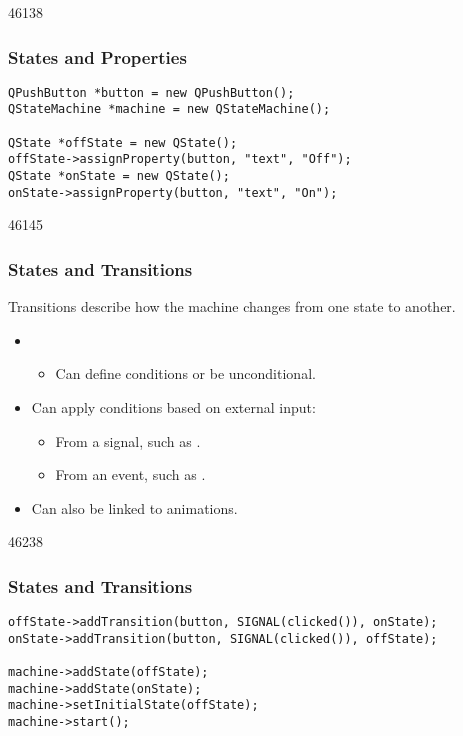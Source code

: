 \begin{slide}[fragile]{46138}\frametitle{States and Properties}
\vspace*{1.5em}
\small
\begin{lstlisting}
QPushButton *button = new QPushButton();
QStateMachine *machine = new QStateMachine();

QState *offState = new QState();
offState->assignProperty(button, "text", "Off");
QState *onState = new QState();
onState->assignProperty(button, "text", "On");
\end{lstlisting}
\normalsize
{}
\vfill
\end{slide}

\begin{slide}{46145}\frametitle{States and Transitions}
\label{Animation-States-Transitions}
Transitions describe how the machine changes from one state to another.

\vspace*{1.5em}
\vspace*{1.0em}

\begin{itemize}
\item {}
\begin{itemize}
\item Can define conditions or be unconditional.
\end{itemize}
\item Can apply conditions based on external input:
\begin{itemize}
\item From a signal, such as .
\item From an event, such as .
\end{itemize}
\item Can also be linked to animations.
\end{itemize}
\end{slide}

\begin{slide}[fragile]{46238}\frametitle{States and Transitions}
\vspace*{1.5em}
\small
\begin{lstlisting}
offState->addTransition(button, SIGNAL(clicked()), onState);
onState->addTransition(button, SIGNAL(clicked()), offState);

machine->addState(offState);
machine->addState(onState);
machine->setInitialState(offState);
machine->start();
\end{lstlisting}
\normalsize
{}
\vfill
\end{slide}

